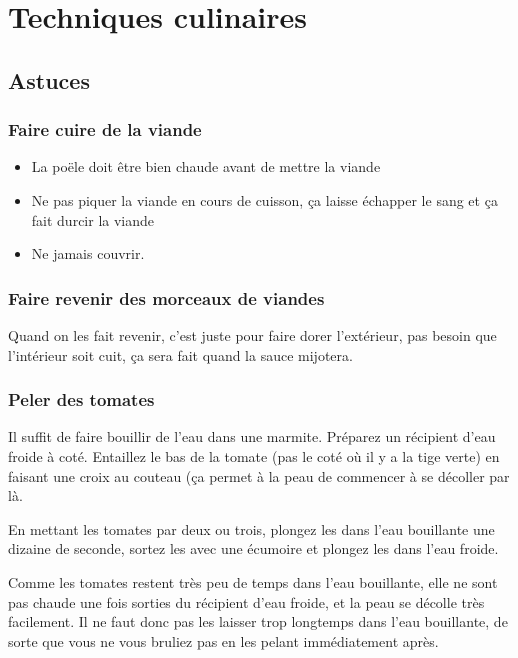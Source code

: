 \documentclass[a4paper,twoside,openright]{report}
\begin{document}
\chapter{Techniques culinaires}
\minitoc
\newpage

\section{Astuces}
\subsection{Faire cuire de la viande}
\begin{itemize}
\item La poële doit être bien chaude avant de mettre la viande
\item Ne pas piquer la viande en cours de cuisson, ça laisse échapper le sang et ça fait durcir la viande
\item Ne jamais couvrir.
\end{itemize}

\subsection{Faire revenir des morceaux de viandes}
Quand on les fait revenir, c'est juste pour faire dorer l'extérieur, pas besoin que l'intérieur soit cuit, ça sera fait quand la sauce mijotera.

\subsection{Peler des tomates}\label{sec:peler_tomate}
Il suffit de faire bouillir de l'eau dans une marmite. Préparez un récipient d'eau froide à coté.
Entaillez le bas de la tomate (pas le coté où il y a la tige verte) en faisant une croix au couteau (ça permet à la peau de commencer à se décoller par là. 

En mettant les tomates par deux ou trois, plongez les dans l'eau bouillante une dizaine de seconde, sortez les avec une écumoire et plongez les dans l'eau froide. 

\begin{remarque}
Comme les tomates restent très peu de temps dans l'eau bouillante, elle ne sont pas chaude une fois sorties du récipient d'eau froide, et la peau se décolle très facilement. Il ne faut donc pas les laisser trop longtemps dans l'eau bouillante, de sorte que vous ne vous bruliez pas en les pelant immédiatement après.
\end{remarque}
\end{document}
